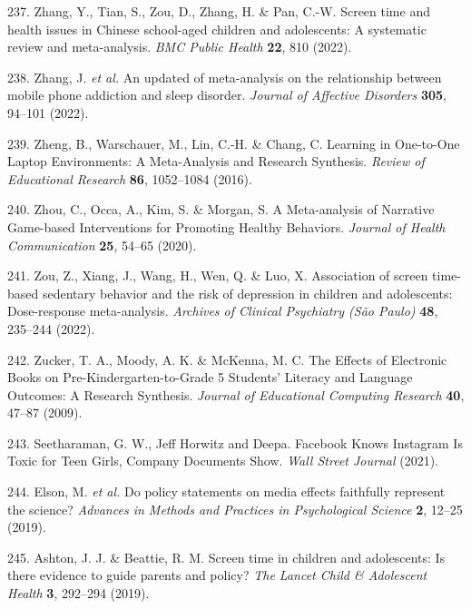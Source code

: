 \documentclass[
  english,
  man]{apa6}
\newenvironment{cslreferences}%
  {}%
  {\par}
\begin{document}
\begin{cslreferences}
\leavevmode\hypertarget{ref-zhangScreenTimeHealth2022}{}%
237. Zhang, Y., Tian, S., Zou, D., Zhang, H. \& Pan, C.-W. Screen time and health issues in Chinese school-aged children and adolescents: A systematic review and meta-analysis. \emph{BMC Public Health} \textbf{22}, 810 (2022).

\leavevmode\hypertarget{ref-zhangUpdatedMetaanalysisRelationship2022}{}%
238. Zhang, J. \emph{et al.} An updated of meta-analysis on the relationship between mobile phone addiction and sleep disorder. \emph{Journal of Affective Disorders} \textbf{305}, 94--101 (2022).

\leavevmode\hypertarget{ref-zhengLearningOnetoOneLaptop2016}{}%
239. Zheng, B., Warschauer, M., Lin, C.-H. \& Chang, C. Learning in One-to-One Laptop Environments: A Meta-Analysis and Research Synthesis. \emph{Review of Educational Research} \textbf{86}, 1052--1084 (2016).

\leavevmode\hypertarget{ref-zhouMetaanalysisNarrativeGamebased2020}{}%
240. Zhou, C., Occa, A., Kim, S. \& Morgan, S. A Meta-analysis of Narrative Game-based Interventions for Promoting Healthy Behaviors. \emph{Journal of Health Communication} \textbf{25}, 54--65 (2020).

\leavevmode\hypertarget{ref-zouAssociationScreenTimebased2021}{}%
241. Zou, Z., Xiang, J., Wang, H., Wen, Q. \& Luo, X. Association of screen time-based sedentary behavior and the risk of depression in children and adolescents: Dose-response meta-analysis. \emph{Archives of Clinical Psychiatry (São Paulo)} \textbf{48}, 235--244 (2022).

\leavevmode\hypertarget{ref-zuckerEffectsElectronicBooks2009}{}%
242. Zucker, T. A., Moody, A. K. \& McKenna, M. C. The Effects of Electronic Books on Pre-Kindergarten-to-Grade 5 Students' Literacy and Language Outcomes: A Research Synthesis. \emph{Journal of Educational Computing Research} \textbf{40}, 47--87 (2009).

\leavevmode\hypertarget{ref-seetharamanFacebookKnowsInstagram2021}{}%
243. Seetharaman, G. W., Jeff Horwitz and Deepa. Facebook Knows Instagram Is Toxic for Teen Girls, Company Documents Show. \emph{Wall Street Journal} (2021).

\leavevmode\hypertarget{ref-elsonPolicyStatementsMedia2019}{}%
244. Elson, M. \emph{et al.} Do policy statements on media effects faithfully represent the science? \emph{Advances in Methods and Practices in Psychological Science} \textbf{2}, 12--25 (2019).

\leavevmode\hypertarget{ref-ashtonScreenTimeChildren2019}{}%
245. Ashton, J. J. \& Beattie, R. M. Screen time in children and adolescents: Is there evidence to guide parents and policy? \emph{The Lancet Child \& Adolescent Health} \textbf{3}, 292--294 (2019).


\end{cslreferences}
\end{document}

